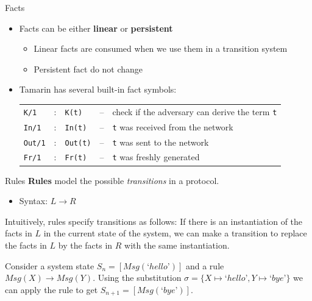 \documentclass[11pt,aspectratio=169]{beamer}
\begin{document}
\begin{frame}[fragile]{Facts}
    \begin{itemize}
        \item Facts can be either \textbf{linear} or \textbf{persistent}
        \begin{itemize}
            \item Linear facts are consumed when we use them in a transition 
                  system
            \item Persistent fact do not change
        \end{itemize}
        \item Tamarin has several built-in fact symbols:
        \begin{table}[]
            \raggedright
            \begin{tabular}{lllll}
                \verb|K/1| &:& \verb|K(t)| & --
                    & check if the adversary can derive the term \verb|t| \\
                \verb|In/1| &:& \verb|In(t)| & --
                    & \verb|t| was received from the network \\
                \verb|Out/1| &:& \verb|Out(t)| & --
                    & \verb|t| was sent to the network \\
                \verb|Fr/1| &:& \verb|Fr(t)| & --
                    & \verb|t| was freshly generated
            \end{tabular}
        \end{table}
    \end{itemize}
\end{frame}

\begin{frame}[fragile]{Rules}
    \textbf{Rules} model the possible \textit{transitions} in a protocol.
    \begin{itemize}
        \item Syntax: $L \rightarrow R$
    \end{itemize}

    Intuitively, rules specify transitions as follows: If there is an 
    instantiation of the facts in $L$ in the current state of the system, we 
    can make a transition to replace the facts in $L$ by the facts in $R$ with 
    the same instantiation.

    \begin{tcolorbox}[title=Example]
        Consider a system state $S_n = [Msg(\text{`}hello\text{'})]$ and a rule 
        $Msg(X) \rightarrow Msg(Y)$. Using the substitution
        $\sigma = \{X \mapsto \text{`}hello\text{'}, Y \mapsto
        \text{`}bye\text{'}\}$ we can apply the rule to get
        $S_{n+1} = [Msg(\text{`}bye\text{'})]$.
    \end{tcolorbox}
\end{frame}
\end{document}
